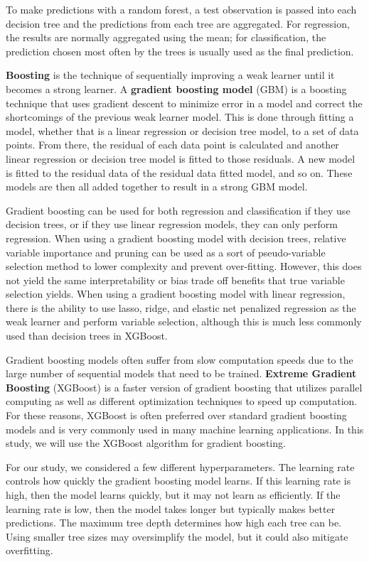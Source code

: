 \documentclass{article}
\begin{document}
To make predictions with a random forest, a test observation is passed into each decision tree and the predictions from each tree are aggregated. For regression, the results are normally aggregated using the mean; for classification, the prediction chosen most often by the trees is usually used as the final prediction.

\textbf{Boosting} is the technique of sequentially improving a weak learner until it becomes a strong learner. A \textbf{gradient boosting model} (GBM) is a boosting technique that uses gradient descent to minimize error in a model and correct the shortcomings of the previous weak learner model. This is done through fitting a model, whether that is a linear regression or decision tree model, to a set of data points. From there, the residual of each data point is calculated and another linear regression or decision tree model is fitted to those residuals. A new model is fitted to the residual data of the residual data fitted model, and so on. These models are then all added together to result in a strong GBM model.

Gradient boosting can be used for both regression and classification if they use decision trees, or if they use linear regression models, they can only perform regression. When using a gradient boosting model with decision trees, relative variable importance and pruning can be used as a sort of pseudo-variable selection method to lower complexity and prevent over-fitting. However, this does not yield the same interpretability or bias trade off benefits that true variable selection yields. When using a gradient boosting model with linear regression, there is the ability to use lasso, ridge, and elastic net penalized regression as the weak learner and perform variable selection, although this is much less commonly used than decision trees in XGBoost.

Gradient boosting models often suffer from slow computation speeds due to the large number of sequential models that need to be trained. \textbf{Extreme Gradient Boosting} (XGBoost) is a faster version of gradient boosting that utilizes parallel computing as well as different optimization techniques to speed up computation. For these reasons, XGBoost is often preferred over standard gradient boosting models and is very commonly used in many machine learning applications. In this study, we will use the XGBoost algorithm for gradient boosting.

For our study, we considered a few different hyperparameters. The learning rate controls how quickly the gradient boosting model learns. If this learning rate is high, then the model learns quickly, but it may not learn as efficiently. If the learning rate is low, then the model takes longer but typically makes better predictions. The maximum tree depth determines how high each tree can be. Using smaller tree sizes may oversimplify the model, but it could also mitigate overfitting.
\end{document}

